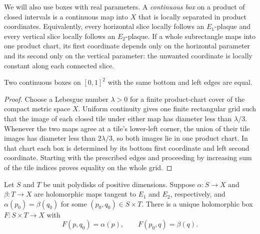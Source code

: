 We will also use boxes with real parameters. A \emph{continuous box} on
a product of closed intervals is a continuous map into \(X\) that is
locally separated in product coordinates. Equivalently, every horizontal
slice locally follows an \(E_1\)-plaque and every vertical slice locally
follows an \(E_2\)-plaque. If a whole subrectangle maps into one product
chart, its first coordinate depends only on the horizontal parameter
and its second only on the vertical parameter: the unwanted coordinate
is locally constant along each connected slice.

\begin{lemma}\label{lem:box-unique}
Two continuous boxes on \([0,1]^2\) with the same bottom and left edges
are equal.
\end{lemma}

\begin{proof}
Choose a Lebesgue number \(\lambda>0\) for a finite product-chart
cover of the compact metric space \(X\). Uniform continuity gives one
finite rectangular grid such that the image of each closed tile under
either map has diameter less than \(\lambda/3\). Whenever the two maps
agree at a tile's lower-left corner, the union of their tile images has
diameter less than \(2\lambda/3\), so both images lie in one product
chart. In that chart each box is determined by its bottom first
coordinate and left second coordinate. Starting with the prescribed
edges and proceeding by increasing sum of the tile indices proves
equality on the whole grid.
\end{proof}

\begin{proposition}\label{prop:polydisk-axes}
Let \(S\) and \(T\) be unit polydisks of positive dimensions. Suppose
\(\alpha:S\to X\) and \(\beta:T\to X\) are holomorphic maps tangent
to \(E_1\) and \(E_2\), respectively, and
\(\alpha(p_0)=\beta(q_0)\) for some \((p_0,q_0)\in S\times T\).
There is a unique holomorphic box \(F:S\times T\to X\) with
\[
 F(p,q_0)=\alpha(p),\qquad F(p_0,q)=\beta(q).
\]
\end{proposition}

